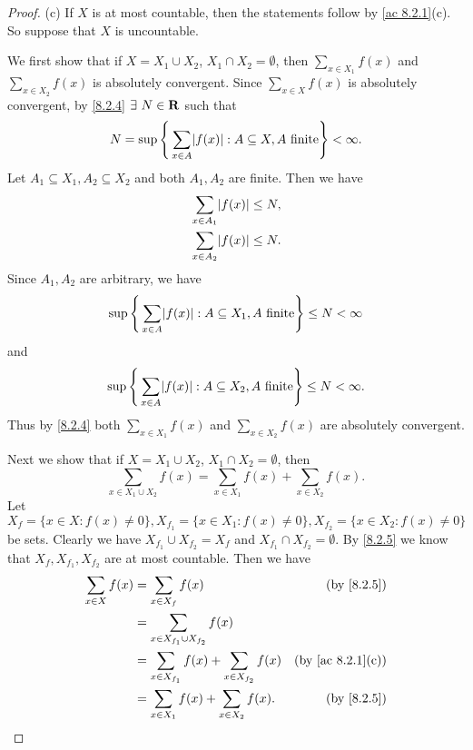 \begin{proof}{(c)}
  If \(X\) is at most countable, then the statements follow by \cref{ac 8.2.1}(c).
  So suppose that \(X\) is uncountable.

  We first show that if \(X = X_1 \cup X_2\), \(X_1 \cap X_2 = \emptyset\), then \(\sum_{x \in X_1} f(x)\) and \(\sum_{x \in X_2} f(x)\) is absolutely convergent.
  Since \(\sum_{x \in X} f(x)\) is absolutely convergent, by \cref{8.2.4} \(\exists\ N \in \mathbf{R}\) such that
  \[
    N = \sup\Bigg\{\sum_{x \in A} \abs{f(x)} : A \subseteq X, A \text{ finite}\Bigg\} < \infty.
  \]
  Let \(A_1 \subseteq X_1, A_2 \subseteq X_2\) and both \(A_1, A_2\) are finite.
  Then we have
  \begin{align*}
     & \sum_{x \in A_1} \abs{f(x)} \leq N, \\
     & \sum_{x \in A_2} \abs{f(x)} \leq N.
  \end{align*}
  Since \(A_1, A_2\) are arbitrary, we have
  \[
    \sup\Bigg\{\sum_{x \in A} \abs{f(x)} : A \subseteq X_1, A \text{ finite}\Bigg\} \leq N < \infty
  \]
  and
  \[
    \sup\Bigg\{\sum_{x \in A} \abs{f(x)} : A \subseteq X_2, A \text{ finite}\Bigg\} \leq N < \infty.
  \]
  Thus by \cref{8.2.4} both \(\sum_{x \in X_1} f(x)\) and \(\sum_{x \in X_2} f(x)\) are absolutely convergent.

  Next we show that if \(X = X_1 \cup X_2\), \(X_1 \cap X_2 = \emptyset\), then
  \[
    \sum_{x \in X_1 \cup X_2} f(x) = \sum_{x \in X_1} f(x) + \sum_{x \in X_2} f(x).
  \]
  Let \(X_f = \{x \in X : f(x) \neq 0\}, X_{f_1} = \{x \in X_1 : f(x) \neq 0\}, X_{f_2} = \{x \in X_2 : f(x) \neq 0\}\) be sets.
  Clearly we have \(X_{f_1} \cup X_{f_2} = X_f\) and \(X_{f_1} \cap X_{f_2} = \emptyset\).
  By \cref{8.2.5} we know that \(X_f, X_{f_1}, X_{f_2}\) are at most countable.
  Then we have
  \begin{align*}
    \sum_{x \in X} f(x) & = \sum_{x \in X_f} f(x)                                 & \text{(by \cref{8.2.5})}       \\
                        & = \sum_{x \in X_{f_1} \cup X_{f_2}} f(x)                                                 \\
                        & = \sum_{x \in X_{f_1}} f(x) + \sum_{x \in X_{f_2}} f(x) & \text{(by \cref{ac 8.2.1}(c))} \\
                        & = \sum_{x \in X_1} f(x) + \sum_{x \in X_2} f(x).        & \text{(by \cref{8.2.5})}
  \end{align*}


\end{proof}
